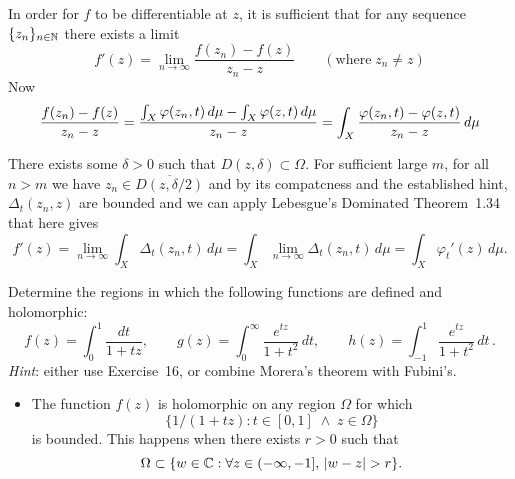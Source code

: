 \begin{enumerate}
In order for $f$ to be differentiable at $z$, it is sufficient that
for any sequence \(\{z_n\}_{n\in\mathbb{N}}\) there exists a limit 
\begin{equation*}
f'(z) = \lim_{n\to\infty} \frac{f(z_n) - f(z)}{z_n - z} 
 \qquad (\text{where}\; z_n \neq z)
\end{equation*}
Now
\begin{equation*}
\frac{f(z_n) - f(z)}{z_n - z} 
= \frac{\int_X \varphi(z_n,t)\,d\mu - \int_X \varphi(z,t)\,d\mu}{z_n - z} \\
= \int_X \frac{\varphi(z_n,t) -  \varphi(z,t)}{z_n - z}\,d\mu
\end{equation*}

There exists some \(\delta>0\) 
such that \({D(z,\delta)}\subset\Omega\).
For sufficient large $m$, for all \(n>m\) 
we have \(z_n\in \overline{D(z,\delta/2)}\) and by its compatcness
and the established hint, \(\Delta_t(z_n,z)\) are bounded
and we can apply 
Lebesgue's Dominated Theorem~1.34 that here gives 
\begin{equation*}
f'(z) 
= \lim_{n\to\infty} \int_X \Delta_t(z_n,t)\,d\mu
= \int_X \lim_{n\to\infty} \Delta_t(z_n,t)\,d\mu
= \int_X \varphi_t'(z)\,d\mu.
\end{equation*}

\begin{excopy}
Determine the regions in which the following functions are defined
and holomorphic:
\begin{equation*}
f(z) = \int_0^1 \frac{dt}{1+tz}, \qquad
g(z) = \int_0^\infty \frac{e^{tz}}{1+t^2}\,dt, \qquad
h(z) = \int_{-1}^1 \frac{e^{tz}}{1+t^2}\,dt\,.
\end{equation*}
\emph{Hint}: either use Exercise~16, or combine
Morera's theorem with
Fubini's.
\end{excopy}

\begin{itemize}

\item The function \(f(z)\) is holomorphic on any region \(\Omega\) for which 
\begin{equation*}
\{1/(1+tz): t\in[0,1]\;\wedge\; z\in\Omega\}
\end{equation*}
is bounded. This happens when there exists \(r > 0\) such that 
\begin{equation*}
\Omega \subset \{w\in\C: \forall z\in (-\infty,-1],\, |w-z|>r\}.
\end{equation*}


\end{itemize}
\end{enumerate}
